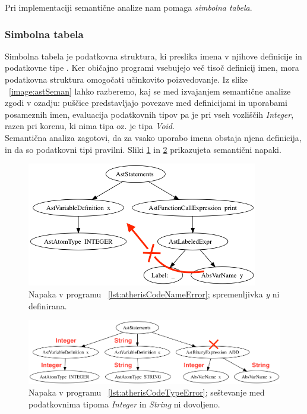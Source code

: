 \documentclass[a4paper, 12p]{book}
\begin{document}
Pri implementaciji semantične analize nam pomaga \textit{simbolna tabela}.

\subsubsection{Simbolna tabela}

Simbolna tabela je podatkovna struktura, ki preslika imena v njihove definicije in podatkovne tipe \cite{modernCompiler}. Ker običajno programi vsebujejo več tisoč definicij imen, mora podatkovna struktura omogočati učinkovito poizvedovanje. Iz slike ~\ref{image:astSeman} lahko razberemo, kaj se med izvajanjem semantične analize zgodi v ozadju: puščice predstavljajo povezave med definicijami in uporabami posameznih imen, evaluacija podatkovnih tipov pa je pri vseh vozliščih \textit{Integer}, razen pri korenu, ki nima tipa oz. je tipa \textit{Void}.\\
\indent Semantična analiza zagotovi, da za vsako uporabo imena obstaja njena definicija, in da so podatkovni tipi pravilni. Sliki \ref{image:astSemanCodeNameError} in \ref{image:astSemanTypeError} prikazujeta semantični napaki.

\begin{figure}[h]
	\begin{center}
		\includegraphics[width=0.9\textwidth]{resources/astSemanNameError.png}
	\end{center}
	\caption{Napaka v programu ~\ref{lst:atherisCodeNameError}; spremenljivka \textit{y} ni definirana.}
	\label{image:astSemanCodeNameError}
\end{figure}

\begin{figure}[h]
	\begin{center}
		\includegraphics[width=1\textwidth]{resources/astSemanTypeError.png}
	\end{center}
	\caption{Napaka v programu ~\ref{lst:atherisCodeTypeError}; seštevanje med podatkovnima tipoma \textit{Integer} in \textit{String} ni dovoljeno.}
	\label{image:astSemanTypeError}
\end{figure}
\end{document}

